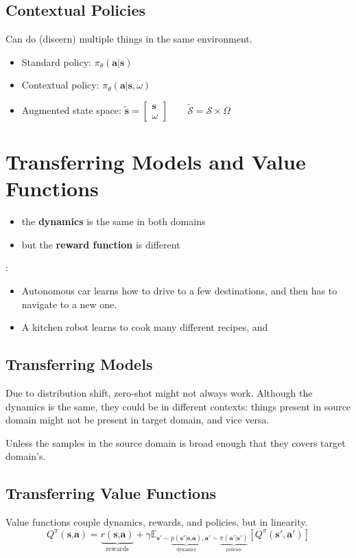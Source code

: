 \subsection{Contextual Policies}
Can do (discern) multiple things in the same environment.
\begin{itemize}
	\item Standard policy: $\pi_\theta(\textbf{a|s})$
	\item Contextual policy: $\pi_\theta(\textbf{a|s}, \omega)$
	\item Augmented state space: $\tilde{\textbf{s}} = \begin{bmatrix}
		\textbf{s}\\
		\omega
	\end{bmatrix} \qquad \tilde{\mathcal{S}} = \mathcal{S} \times \Omega$
\end{itemize}

\section{Transferring Models and Value Functions}
\begin{itemize}
	\item the \textbf{dynamics} is the same in both domains
	\item but the \textbf{reward function} is different
\end{itemize}

\Eg:
\begin{itemize}
	\item Autonomous car learns how to drive to a few destinations, and then has to navigate to a new one.
	\item A kitchen robot learns to cook many different recipes, and
\end{itemize}

\subsection{Transferring Models}
Due to distribution shift, zero-shot might not always work. Although the dynamics is the same, they could be in different contexts: things present in source domain might not be present in target domain, and vice versa.

Unless the samples in the source domain is broad enough that they covers target domain's. 

\subsection{Transferring Value Functions}
Value functions couple dynamics, rewards, and policies, but in linearity.
\begin{equation}
	Q^\pi(\textbf{s,a}) = \underbrace{r(\textbf{s,a})}_{\textstyle \text{rewards}} + \gamma \mathbb{E}_{\textbf{s}' \sim \underbrace{p(\textbf{s}'|\textbf{s,a})}_{\textstyle \text{dynamics}}, \textbf{a}'\sim \underbrace{\pi(\textbf{a}'|\textbf{s}')}_{\textstyle \text{policies}}} [Q^\pi (\textbf{s}', \textbf{a}')]
\end{equation}

